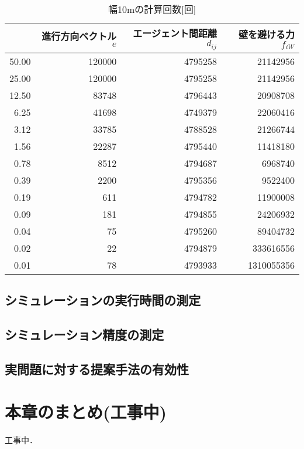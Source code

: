 \begin{table}[t]
  \centering
  \caption{幅10mの計算回数[回]}
  \label{tb:haba10_times}
  \begin{tabular}{r|r|r|r}
  \hline \hline
          & 進行方向ベクトル$e$ & エージェント間距離$d_{ij}$ & 壁を避ける力$f_{iW}$ \\ \hline
    50.00 & 120000 & 4795258 & 21142956 \\ \hline
    25.00 & 120000 & 4795258 & 21142956 \\ \hline
    12.50 & 83748 & 4796443 & 20908708 \\ \hline
    6.25 & 41698 & 4749379 & 22060416 \\ \hline
    3.12 & 33785 & 4788528 & 21266744 \\ \hline
    1.56 & 22287 & 4795440 & 11418180 \\ \hline
    0.78 & 8512 & 4794687 & 6968740 \\ \hline
    0.39 & 2200 & 4795356 & 9522400 \\ \hline
    0.19 & 611 & 4794782 & 11900008 \\ \hline
    0.09 & 181 & 4794855 & 24206932 \\ \hline
    0.04 & 75 & 4795260 & 89404732 \\ \hline
    0.02 & 22 & 4794879 & 333616556 \\ \hline
    0.01 & 78 & 4793933 & 1310055356 \\ \hline
  \end{tabular}
\end{table}



\subsection{シミュレーションの実行時間の測定}

\subsection{シミュレーション精度の測定}

\subsection{実問題に対する提案手法の有効性}

\section{本章のまとめ(工事中)}
工事中．

